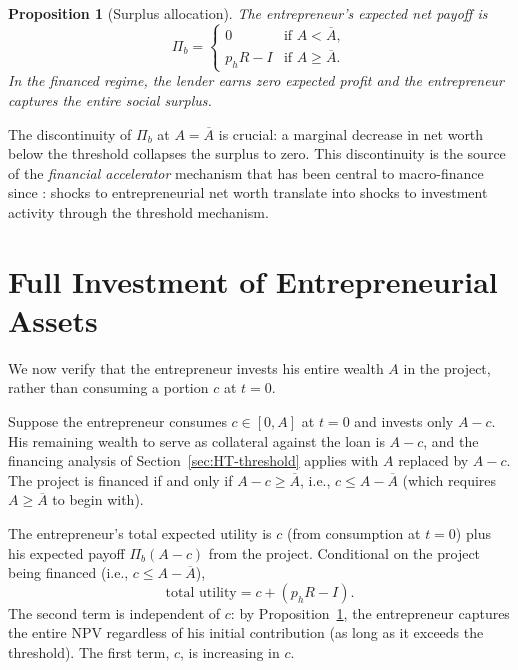 \documentclass[11pt,a4paper,oneside]{book}
\def\leq{\leqslant}
\def\geq{\geqslant}
\theoremstyle{plain}
\newtheorem{proposition}[theorem]{Proposition}
\theoremstyle{definition}
\theoremstyle{remark}
\numberwithin{equation}{chapter}
\begin{document}
\begin{proposition}[Surplus allocation]\label{prop:surplus}
The entrepreneur's expected net payoff is
\begin{equation}\label{eq:Pi_b}
  \Pi_b = \begin{cases}
    0 & \text{if } A < \overline{A}, \\
    p_h R - I & \text{if } A \geq \overline{A}.
  \end{cases}
\end{equation}
In the financed regime, the lender earns zero expected profit and the entrepreneur captures the entire social surplus.
\end{proposition}

The discontinuity of $\Pi_b$ at $A = \overline{A}$ is crucial: a marginal decrease in net worth below the threshold collapses the surplus to zero.
This discontinuity is the source of the \emph{financial accelerator} mechanism that has been central to macro-finance since \citet{HolmstromTirole1997}: shocks to entrepreneurial net worth translate into shocks to investment activity through the threshold mechanism.

\section{Full Investment of Entrepreneurial Assets}
\label{sec:HT-full-investment}

We now verify that the entrepreneur invests his entire wealth $A$ in the project, rather than consuming a portion $c$ at $t=0$.

Suppose the entrepreneur consumes $c \in [0, A]$ at $t=0$ and invests only $A - c$.
His remaining wealth to serve as collateral against the loan is $A - c$, and the financing analysis of Section~\ref{sec:HT-threshold} applies with $A$ replaced by $A - c$.
The project is financed if and only if $A - c \geq \overline{A}$, i.e., $c \leq A - \overline{A}$ (which requires $A \geq \overline{A}$ to begin with).

The entrepreneur's total expected utility is $c$ (from consumption at $t=0$) plus his expected payoff $\Pi_b(A - c)$ from the project.
Conditional on the project being financed (i.e., $c \leq A - \overline{A}$),
\begin{equation*}
  \text{total utility} = c + (p_h R - I).
\end{equation*}
The second term is independent of $c$: by Proposition~\ref{prop:surplus}, the entrepreneur captures the entire NPV regardless of his initial contribution (as long as it exceeds the threshold).
The first term, $c$, is increasing in $c$.
\end{document}
